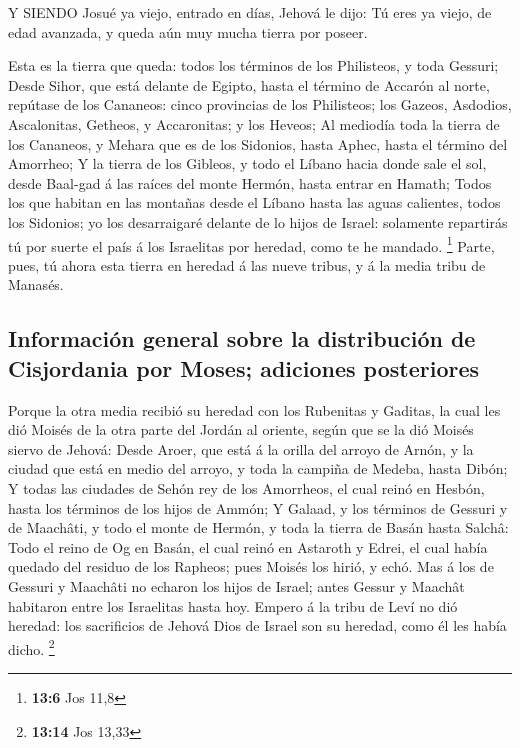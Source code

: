  Y SIENDO Josué ya viejo, entrado en días, Jehová le dijo:
Tú eres ya viejo, de edad avanzada, y queda aún muy mucha tierra por
poseer.

 Esta es la tierra que queda: todos los términos de los
Philisteos, y toda Gessuri;  Desde Sihor, que está delante
de Egipto, hasta el término de Accarón al norte, repútase de los
Cananeos: cinco provincias de los Philisteos; los Gazeos, Asdodios,
Ascalonitas, Getheos, y Accaronitas; y los Heveos;  Al
mediodía toda la tierra de los Cananeos, y Mehara que es de los
Sidonios, hasta Aphec, hasta el término del Amorrheo;  Y la
tierra de los Gibleos, y todo el Líbano hacia donde sale el sol, desde
Baal-gad á las raíces del monte Hermón, hasta entrar en Hamath;
 Todos los que habitan en las montañas desde el Líbano hasta
las aguas calientes, todos los Sidonios; yo los desarraigaré delante de
lo hijos de Israel: solamente repartirás tú por suerte el país á los
Israelitas por heredad, como te he mandado. \footnote{\textbf{13:6} Jos
  11,8}  Parte, pues, tú ahora esta tierra en heredad á las
nueve tribus, y á la media tribu de Manasés.

\hypertarget{informaciuxf3n-general-sobre-la-distribuciuxf3n-de-cisjordania-por-moses-adiciones-posteriores}{%
\subsection{Información general sobre la distribución de Cisjordania por
Moses; adiciones
posteriores}\label{informaciuxf3n-general-sobre-la-distribuciuxf3n-de-cisjordania-por-moses-adiciones-posteriores}}

 Porque la otra media recibió su heredad con los Rubenitas y
Gaditas, la cual les dió Moisés de la otra parte del Jordán al oriente,
según que se la dió Moisés siervo de Jehová:  Desde Aroer,
que está á la orilla del arroyo de Arnón, y la ciudad que está en medio
del arroyo, y toda la campiña de Medeba, hasta Dibón;  Y
todas las ciudades de Sehón rey de los Amorrheos, el cual reinó en
Hesbón, hasta los términos de los hijos de Ammón;  Y
Galaad, y los términos de Gessuri y de Maachâti, y todo el monte de
Hermón, y toda la tierra de Basán hasta Salchâ:  Todo el
reino de Og en Basán, el cual reinó en Astaroth y Edrei, el cual había
quedado del residuo de los Rapheos; pues Moisés los hirió, y echó.
 Mas á los de Gessuri y Maachâti no echaron los hijos de
Israel; antes Gessur y Maachât habitaron entre los Israelitas hasta hoy.
 Empero á la tribu de Leví no dió heredad: los sacrificios
de Jehová Dios de Israel son su heredad, como él les había dicho.
\footnote{\textbf{13:14} Jos 13,33}


